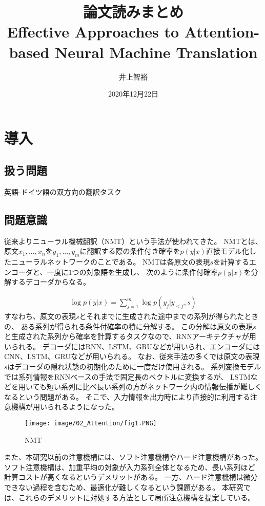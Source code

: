 \documentclass{jsarticle}
\title{\vspace{-3cm}論文読みまとめ\\Effective Approaches to Attention-based Neural Machine Translation
}
\author{井上智裕}
\date{2020年12月22日}
\begin{document}
\maketitle
\vspace{-1cm}
\section{導入}
\subsection{扱う問題}
英語-ドイツ語の双方向の翻訳タスク

\subsection{問題意識}
従来よりニューラル機械翻訳（NMT）という手法が使われてきた。 
NMTとは、原文$x_1, . . . , x_n$を$ y_1, . . . , y_m$に翻訳する際の条件付き確率を$p(y|x)$直接モデル化したニューラルネットワークのことである。
NMTは各原文の表現$s$を計算するエンコーダと、一度に1つの対象語を生成し、
次のように条件付確率$p(y|x)$を分解するデコーダからなる。

\begin{eqnarray}
  \log p(y|x) = \sum_{j=1}^m \log p(y_j|y_{<j},s)
\end{eqnarray}
すなわち、原文の表現$s$とそれまでに生成された途中までの系列が得られたときの、
ある系列が得られる条件付確率の積に分解する。
この分解は原文の表現$s$と生成された系列から確率を計算するタスクなので、RNNアーキテクチャが用いられる。
デコーダにはRNN、LSTM、GRUなどが用いられ、エンコーダにはCNN、LSTM、GRUなどが用いられる。
なお、従来手法の多くでは原文の表現$s$はデコーダの隠れ状態の初期化のために一度だけ使用される。
系列変換モデルでは系列情報をRNNベースの手法で固定長のベクトルに変換するが、
LSTMなどを用いても短い系列に比べ長い系列の方がネットワーク内の情報伝播が難しくなるという問題がある。
そこで、入力情報を出力時により直接的に利用する注意機構が用いられるようになった。

\begin{figure}[H]
  \begin{center}
    \texttt{[image: image/02\_Attention/fig1.PNG]}
    \caption{NMT}
    \label{fig:fig1}
  \end{center}
\end{figure}

また、本研究以前の注意機構には、ソフト注意機構やハード注意機構があった。
ソフト注意機構は、加重平均の対象が入力系列全体となるため、長い系列ほど
計算コストが高くなるというデメリットがある。
一方、ハード注意機構は微分できない過程を含むため、最適化が難しくなるという課題がある。
本研究では、これらのデメリットに対処する方法として局所注意機構を提案している。
\end{document}
